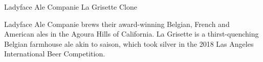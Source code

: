\stylesection{\stylebelgianandfrenchale}

\begin{recipie}{Ladyface Ale Companie La Grisette Clone}

\begin{aboutblock}
Ladyface Ale Companie brews their award-winning Belgian, French and American
ales in the Agoura Hills of California. La Grisette is a thirst-quenching
Belgian farmhouse ale akin to saison, which took silver in the 2018 Las Angeles
International Beer Competition. \sourceaha
\end{aboutblock}


\begin{methodandtiming}
 
\begin{mashsteps}
\end{mashsteps}

\end{methodandtiming}

\pagebreak

\begin{ingredientsblock}

\begin{malts}
\end{malts}

\begin{hops}
\end{hops}


\end{ingredientsblock}

\end{recipie}

